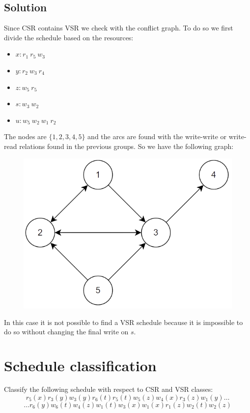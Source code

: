 \documentclass[12pt, a4paper]{report}
\begin{document}
    \subsection*{Solution}
        Since CSR contains VSR we check with the conflict graph. To do so we first divide the schedule based on the resources: 
        \begin{itemize}
            \item $x: r_1 \: r_5 \: w_3$
            \item $y: r_2 \: w_3 \: r_4$
            \item $z: w_5 \: r_5$
            \item $s: w_3 \: w_2$
            \item $u: w_5 \: w_2 \: w_1 \: r_2$
        \end{itemize}
        The nodes are $\{1,2,3,4,5\}$ and the arcs are found with the write-write or write-read relations found in the previous groups. So we have the following graph:
        \begin{figure}[H]
            \centering
            \includegraphics[width=0.5\linewidth]{images/conflictgraph2.png}
        \end{figure}
        In this case it is not possible to find a VSR schedule because it is impossible to do so without changing the final write on $s$. 

    \newpage

    \section{Schedule classification}
        Classify the following schedule with respect to CSR and VSR classes:  
        \[r_5(x) r_3(y) w_3(y) r_6(t) r_5(t) w_5(z) w_4(x) r_3(z) w_1(y) \dots\]
        \[\dots r_6(y) w_6(t) w_4(z) w_1(t) w_3(x) w_1(x) r_1(z) w_2(t) w_2(z)\]
\end{document}
